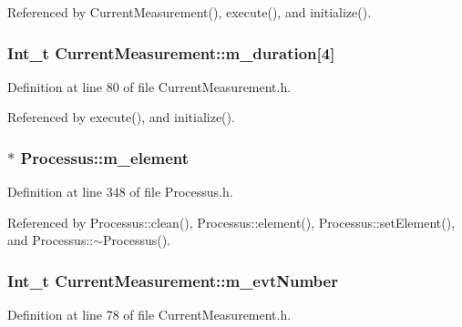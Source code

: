 Referenced by CurrentMeasurement(), execute(), and initialize().\hypertarget{classCurrentMeasurement_ad08307f13d37c05e1a4e42ff39c97911}{
\subsubsection[{m\_\-duration}]{\setlength{\rightskip}{0pt plus 5cm}Int\_\-t {\bf CurrentMeasurement::m\_\-duration}\mbox{[}4\mbox{]}}}
\label{classCurrentMeasurement_ad08307f13d37c05e1a4e42ff39c97911}


Definition at line 80 of file CurrentMeasurement.h.

Referenced by execute(), and initialize().\hypertarget{classProcessus_aa9d24d53c3e52f36786cabb5d8e296e7}{
\subsubsection[{m\_\-element}]{$\ast$ {\bf Processus::m\_\-element}}}
\label{classProcessus_aa9d24d53c3e52f36786cabb5d8e296e7}


Definition at line 348 of file Processus.h.

Referenced by Processus::clean(), Processus::element(), Processus::setElement(), and Processus::$\sim$Processus().\hypertarget{classCurrentMeasurement_a6e01f96c84aec986de9a9f7393ccb2c6}{
\subsubsection[{m\_\-evtNumber}]{\setlength{\rightskip}{0pt plus 5cm}Int\_\-t {\bf CurrentMeasurement::m\_\-evtNumber}}}
\label{classCurrentMeasurement_a6e01f96c84aec986de9a9f7393ccb2c6}


Definition at line 78 of file CurrentMeasurement.h.

